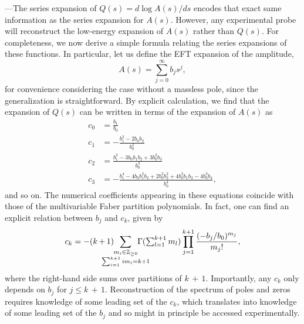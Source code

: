 \documentclass[twocolumn,english,aps,prd,reprint,floatfix,notitlepage,footinbib,preprintnumbers,superscriptaddress,longbibliography]{revtex4-1}
\newcommand{\be}{\begin{equation}}
\newcommand{\ee}{\end{equation}}
\newcommand{\mysec}[1]{\noindent {\bf #1.}---}
\begin{document}
\pagebreak


\appendix


\mysec{Appendix A: From $A(s)$ to $Q(s)$}\label{app:AQ}The series expansion of $Q(s)= d \log A(s)/ds$ encodes that exact same information as the series expansion for $A(s)$.
However, any experimental probe will reconstruct the low-energy expansion of $A(s)$ rather than $Q(s)$.
For completeness, we now derive a simple formula relating the series expansions of these functions.
In particular, let us define the EFT expansion of the amplitude,
\be
A(s) = \sum_{j=0}^\infty b_j s^j,
\ee
for convenience considering the case without a massless pole, since the generalization is straightforward. By explicit calculation, we find that the expansion of $Q(s)$ can be written in terms of the expansion of $A(s)$ as
\be
\begin{aligned}
c_0 &= \frac{b_1}{b_0} \\
c_1 &= -\frac{b_1^2 - 2b_0 b_2}{b_0^2} \\
c_2 &= \frac{b_1^3 -3 b_0 b_1 b_2 + 3b_0^2 b_3}{b_0^3}  \\
c_3 &= -\frac{b_1^4 - 4b_0 b_1^2 b_2 + 2b_0^2 b_2^2 + 4 b_0^2 b_1 b_3 -4 b_0^3 b_4}{b_0^4},
\end{aligned}
\ee
and so on.
The numerical coefficients appearing in these equations coincide with those of the multivariable Faber partition polynomials.  In fact, one can find an explicit relation between $b_j$  and $c_k$, given by
\be
\hspace{-1mm} c_k = -(k\,{+}\,1) \!\!\!\!\!\!\!\!\!\! \sum_{\substack{m_i \in \mathbb{Z}_{\geq 0}\\ \sum_{i=1}^{k+1} i m_i = k+1}} \!\!\!\!\!\!\!\!\!\!\Gamma({\textstyle\sum_{l=1}^{k+1}m_l}) \prod_{j=1}^{k+1} \frac{(-b_j/b_0)^{m_j}}{m_j!},\hspace{-1mm}
\ee
where the right-hand side sums over partitions of $k\,{+}\,1$.
Importantly, any $c_k$ only depends on $b_j$ for $j\leq k\,{+}\,1$.  Reconstruction of the spectrum of poles and zeros requires knowledge of some leading set of the $c_k$, which translates into knowledge of some leading set of the $b_j$ and so might in principle be accessed experimentally.

\bigskip
\end{document}
